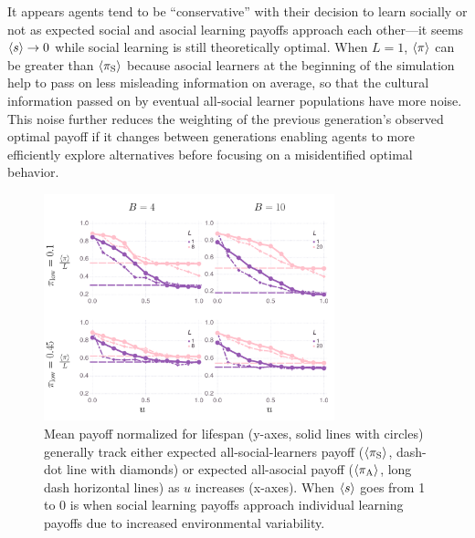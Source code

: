 \documentclass[letterpaper,11.5pt]{scrartcl}
\begin{document}
It appears agents tend to be ``conservative'' with their decision to learn socially
or not as expected social and asocial learning payoffs approach each
other---it seems $\langle s \rangle \to 0$ while social
learning is still theoretically optimal. When $L=1$, $\langle \pi \rangle$ can be greater than
$\langle \pi_\mathrm{S} \rangle$ because asocial learners at the beginning of the simulation help to 
pass on less misleading information on average, so that the cultural information passed on by
eventual all-social learner populations have more noise. This noise further reduces the
weighting of the previous generation's observed optimal payoff if it changes between
generations enabling agents to more efficiently explore alternatives before focusing
on a misidentified optimal behavior. 

\begin{figure}
  \caption{Mean payoff normalized for lifespan (y-axes, solid lines with circles)
    generally track either expected all-social-learners payoff ($\langle \pi_\mathrm{S} \rangle$, dash-dot
    line with diamonds) or expected all-asocial payoff ($\langle \pi_\mathrm{A} \rangle$, long dash
    horizontal lines) as $u$ increases (x-axes). When $\langle s \rangle$ goes from 1 to
  0 is when social learning payoffs approach individual learning payoffs due to
increased environmental variability.} 
  \label{fig:payoffs}
\centering
    \includegraphics[width=0.75\textwidth]{Figures/meanNetPayoffs.pdf}
\end{figure}
\end{document}
